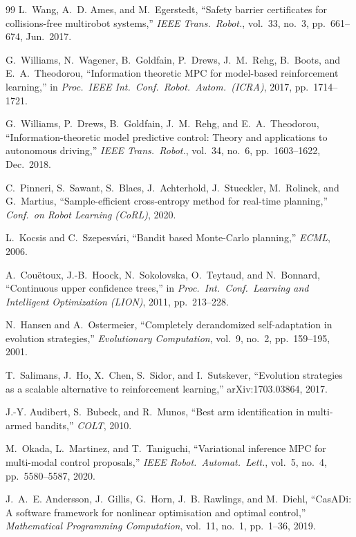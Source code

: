 \documentclass[11pt,onecolumn,a4paper]{article}
\begin{document}
\begin{thebibliography}{99}
L.~Wang, A.~D. Ames, and M.~Egerstedt, ``Safety barrier certificates
for collisions-free multirobot systems,'' \emph{IEEE Trans.\ Robot.},
vol.~33, no.~3, pp.~661--674, Jun.\ 2017.

G.~Williams, N.~Wagener, B.~Goldfain, P.~Drews, J.~M.~Rehg,
B.~Boots, and E.~A.~Theodorou, ``Information theoretic MPC for
model-based reinforcement learning,'' in \emph{Proc.\ IEEE Int.\ Conf.\
Robot.\ Autom.\ (ICRA)}, 2017, pp.~1714--1721.

G.~Williams, P.~Drews, B.~Goldfain, J.~M.~Rehg, and
E.~A.~Theodorou, ``Information-theoretic model predictive control:
Theory and applications to autonomous driving,'' \emph{IEEE Trans.\
Robot.}, vol.~34, no.~6, pp.~1603--1622, Dec.\ 2018.

C.~Pinneri, S.~Sawant, S.~Blaes, J.~Achterhold, J.~Stueckler,
M.~Rolinek, and G.~Martius, ``Sample-efficient cross-entropy method
for real-time planning,'' \emph{Conf.\ on Robot Learning (CoRL)},
2020.

L.~Kocsis and C.~Szepesv\'ari, ``Bandit based Monte-Carlo planning,''
\emph{ECML}, 2006.

A.~Couëtoux, J.-B.~Hoock, N.~Sokolovska, O.~Teytaud, and N.~Bonnard,
``Continuous upper confidence trees,'' in \emph{Proc.\ Int.\ Conf.\
Learning and Intelligent Optimization (LION)}, 2011, pp.~213--228.

\bibitem{HAN01}
N.~Hansen and A.~Ostermeier, ``Completely derandomized self-adaptation
in evolution strategies,'' \emph{Evolutionary Computation}, vol.~9,
no.~2, pp.~159--195, 2001.

\bibitem{SAL17}
T.~Salimans, J.~Ho, X.~Chen, S.~Sidor, and I.~Sutskever, ``Evolution
strategies as a scalable alternative to reinforcement learning,''
arXiv:1703.03864, 2017.

\bibitem{AUD10}
J.-Y. Audibert, S.~Bubeck, and R.~Munos, ``Best arm identification in
multi-armed bandits,'' \emph{COLT}, 2010.

\bibitem{OKA20}
M.~Okada, L.~Martinez, and T.~Taniguchi, ``Variational inference MPC
for multi-modal control proposals,'' \emph{IEEE Robot.\ Automat.\
Lett.}, vol.~5, no.~4, pp.~5580--5587, 2020.

\bibitem{AND19}
J.~A.~E. Andersson, J.~Gillis, G.~Horn, J.~B. Rawlings, and M.~Diehl,
``CasADi: A software framework for nonlinear optimisation and
optimal control,'' \emph{Mathematical Programming Computation},
vol.~11, no.~1, pp.~1--36, 2019.


\end{thebibliography}
\end{document}
